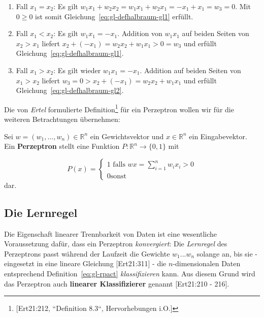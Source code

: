 \begin{enumerate}
    \item Fall $x_1 = x_2$: Es gilt $w_1x_1 + w_2x_2 = w_1x_1 + w_2x_1 = -x_1 + x_1 = w_3 = 0$. Mit $0 \geq 0$ ist somit Gleichung~\ref{eq:gl-defhalbraum-gl1} erfüllt.
    \item Fall $x_1 < x_2$: Es gilt $w_1x_1 = -x_1$. Addition von $w_1x_1$ auf beiden Seiten von $x_2 > x_1$ liefert $x_2 + (-x_1) = w_2x_2 + w_1x_1 > 0 = w_3$ und erfüllt Gleichung~\ref{eq:gl-defhalbraum-gl1}.
    \item Fall $x_1 > x_2$: Es gilt wieder $w_1x_1 = -x_1$. Addition auf beiden Seiten von $x_1 > x_2$ liefert $w_3 = 0 > x_2 + (-x_1) = w_2x_2 + w_1x_1$ und erfüllt Gleichung~\ref{eq:gl-defhalbraum-gl2}.
\end{enumerate}


\noindent
Die von \textit{Ertel} formulierte Definition\footnote{
    [Ert21:212, ``Definition 8.3``, Hervorhebungen i.O.]
} für ein Perzeptron wollen wir für die weiteren Betrachtungen übernehmen:

\begin{definition}
\noindent
Sei $w = (w_1, ..., w_n) \in  \mathbb{R}^n$ ein Gewichtsvektor und $x \in  \mathbb{R}^n$ ein Eingabevektor. Ein \textbf{Perzeptron} stellt eine Funktion $P:  \mathbb{R}^n \to \{0, 1\}$ mit

\begin{equation}
P(x) = \begin{cases}
            1 \text{ falls } wx = \sum^n_{i=1} w_ix_i >0 \\
            0 \text{sonst}
\end{cases}
\end{equation}
\noindent
dar.

\end{definition}

\subsection{Die Lernregel}\label{sec-lernregel}

Die Eigenschaft linearer Trennbarkeit von Daten ist eine wesentliche Voraussetzung dafür, dass ein Perzeptron \textit{konvergiert}: Die \textit{Lernregel} des Perzeptrons passt während der Laufzeit die Gewichte $w_1 ... w_n$ solange an, bis sie - eingesetzt in eine lineare Gleichung [Ert21:311] - die $n$-dimensionalen Daten entsprechend Definition~\ref{eq:gl-rpact} \textit{klassifizieren} kann.
Aus diesem Grund wird das Perzeptron auch \textbf{linearer Klassifizierer} genannt [Ert21:210 - 216].

